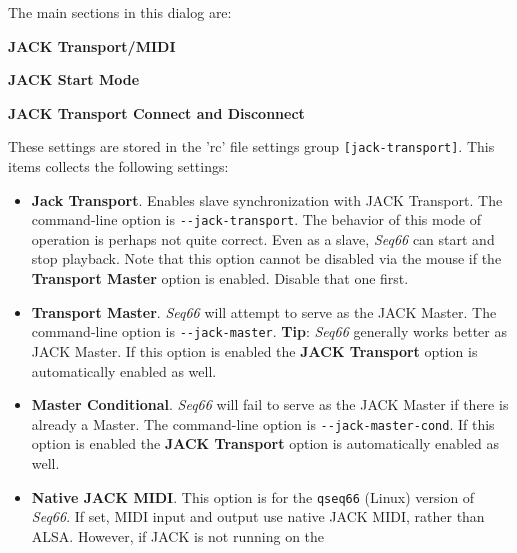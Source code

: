    The main sections in this dialog are:

   \begin{enumber}
      \item \textbf{JACK Transport/MIDI}
      \item \textbf{JACK Start Mode}
      \item \textbf{JACK Transport Connect and Disconnect}
   \end{enumber}

   \setcounter{ItemCounter}{0}      %

   These settings are stored in the 'rc' file settings group
   \texttt{[jack-transport]}.
   This items collects the following settings:

   \begin{itemize}
      \item \textbf{Jack Transport}.
         Enables slave synchronization with JACK Transport.
         The command-line option is \texttt{-{}-jack-transport}.
         The behavior of this mode of operation is perhaps not quite
         correct.  Even as a slave, \textsl{Seq66} can start and
         stop playback.
         Note that this option cannot be disabled via the mouse if the
         \textbf{Transport Master} option is enabled.  Disable that one first.
      \item \textbf{Transport Master}.
         \textsl{Seq66} will attempt to serve as the JACK Master.
         The command-line option is \texttt{-{}-jack-master}.
         \textbf{Tip}:
         \textsl{Seq66} generally works better as JACK Master.
         If this option is enabled the \textbf{JACK Transport} option is
         automatically enabled as well.
      \item \textbf{Master Conditional}.
         \textsl{Seq66} will fail to serve as the JACK Master if there is
         already a Master.
         The command-line option is \texttt{-{}-jack-master-cond}.
         If this option is enabled the \textbf{JACK Transport} option is
         automatically enabled as well.
      \item \textbf{Native JACK MIDI}.
         This option is for the \texttt{qseq66} (Linux) version of
         \textsl{Seq66}.
         If set, MIDI input and output use native JACK MIDI,
         rather than ALSA.  However, if JACK is not running on the

\end{itemize}
